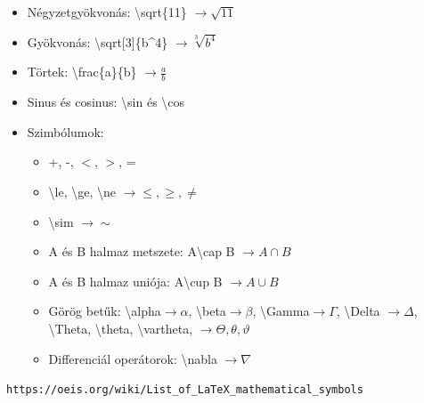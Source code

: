 \documentclass[aspectratio=169]{beamer}
\begin{document}
\begin{frame}
\begin{itemize}
\item Négyzetgyökvonás: \textbackslash sqrt\{11\}  $\rightarrow\sqrt{11}$
\item Gyökvonás: \textbackslash sqrt[3]\{b\^{}4\} $\rightarrow\sqrt[3]{b^4}$
\item Törtek: \textbackslash frac\{a\}\{b\} $\rightarrow\frac{a}{b}$
\item Sinus és cosinus: \textbackslash sin és \textbackslash cos
\item Szimbólumok: 
\begin{itemize}
\item +, -, $<$, $>$, =
\item \textbackslash le, \textbackslash ge, \textbackslash ne $\rightarrow\le, \ge, \ne$
\item \textbackslash sim $\rightarrow \sim$
\item A és B halmaz metszete: A\textbackslash cap B $\rightarrow A\cap B$
\item A és B halmaz uniója: A\textbackslash cup B $\rightarrow A\cup B$
\item Görög betűk: \textbackslash alpha$\rightarrow\alpha$, \textbackslash beta$\rightarrow\beta$, \textbackslash Gamma$\rightarrow\Gamma$, \textbackslash Delta $\rightarrow\Delta$, \textbackslash Theta, \textbackslash theta, \textbackslash vartheta, $\rightarrow\Theta, \theta, \vartheta$
\item Differenciál operátorok: \textbackslash nabla $\rightarrow\nabla$
\end{itemize}
\end{itemize}
\texttt{https://oeis.org/wiki/List\_of\_LaTeX\_mathematical\_symbols}
\vfill

\pagebreak %


\end{frame}
\end{document}
